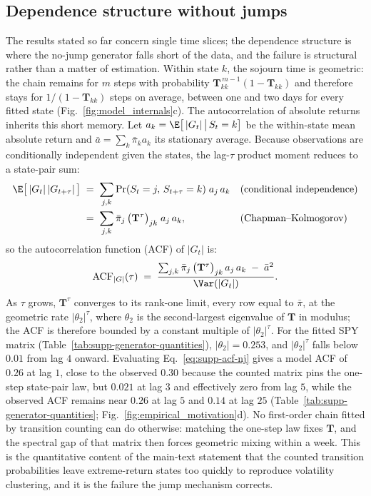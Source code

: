 \subsection{Dependence structure without jumps}
\label{sec:supp-gen-nojump}

The results stated so far concern single time slices; the dependence
structure is where the no-jump generator falls short of the data, and
the failure is structural rather than a matter of estimation. Within
state $k$, the sojourn time is geometric: the chain remains for $m$
steps with probability
$\mathbf{T}_{kk}^{\,m-1} (1 - \mathbf{T}_{kk})$ and therefore stays
for $1/(1 - \mathbf{T}_{kk})$ steps on average, between one and two
days for every fitted state
(Fig.~\ref{fig:model_internals}c). The autocorrelation
of absolute returns inherits this short memory. Let $a_k =
\E\big[\,|G_t| \,\big|\, S_t = k\big]$ be the within-state mean
absolute return and $\bar a = \sum_k \bar\pi_k a_k$ its stationary
average. Because observations are conditionally independent given the
states, the lag-$\tau$ product moment reduces to a state-pair sum:
\begin{align}
  \E\big[\,|G_t|\, |G_{t+\tau}|\,\big]
   &\;=\; \sum_{j, k}
     \Pr(S_t = j,\, S_{t+\tau} = k)\; a_j\, a_k
     && \text{(conditional independence)} \notag \\
   &\;=\; \sum_{j, k} \bar\pi_j\,
     \big(\mathbf{T}^\tau\big)_{jk}\; a_j\, a_k,
     && \text{(Chapman--Kolmogorov)}
  \label{eq:supp-acf-nj}
\end{align}
so the autocorrelation function (ACF) of $|G_t|$ is:
\begin{equation}
  \mathrm{ACF}_{|G|}(\tau)
  \;=\; \frac{\sum_{j, k} \bar\pi_j\,
    \big(\mathbf{T}^\tau\big)_{jk}\, a_j\, a_k \;-\; \bar a^2}
    {\Var(|G_t|)}.
  \label{eq:supp-acf-nj-def}
\end{equation}
As $\tau$ grows, $\mathbf{T}^\tau$ converges
to its rank-one limit, every row equal to $\bar\pi$, at the geometric
rate $|\theta_2|^\tau$, where $\theta_2$ is the second-largest
eigenvalue of $\mathbf{T}$ in modulus; the ACF is therefore bounded
by a constant multiple of $|\theta_2|^\tau$. For the fitted SPY
matrix (Table~\ref{tab:supp-generator-quantities}), $|\theta_2| = 0.253$, and $|\theta_2|^\tau$ falls below
$0.01$ from lag $4$ onward. Evaluating Eq.~\eqref{eq:supp-acf-nj}
gives a model ACF of $0.26$ at lag $1$, close to the observed $0.30$
because the counted matrix pins the one-step state-pair law, but
$0.021$ at lag $3$ and effectively zero from lag $5$, while the
observed ACF remains near $0.26$ at lag $5$ and $0.14$ at lag $25$
(Table~\ref{tab:supp-generator-quantities};
Fig.~\ref{fig:empirical_motivation}d). No first-order chain fitted by transition counting can do otherwise:
matching the one-step law fixes $\mathbf{T}$, and the spectral gap of
that matrix then forces geometric mixing within a week. This is the
quantitative content of the main-text statement that the counted
transition probabilities leave extreme-return states too quickly to
reproduce volatility clustering, and it is the failure the jump
mechanism corrects.

